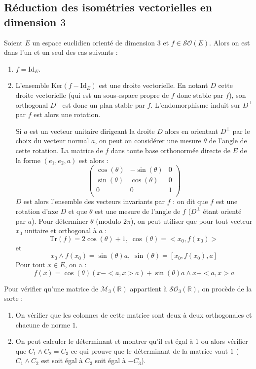 \documentclass[a4paper,10pt]{report}
\begin{document}
\begin{preuve}
\vspace{3cm}
\end{preuve}

\subsection{Réduction des isométries vectorielles en dimension $3$}
\begin{thm}[Admis] Soient $E$ un espace euclidien orienté de dimension $3$ et $f \in \mathcal{SO}(E)$. Alors on est dans l'un et un seul des cas suivants :
\begin{enumerate}
\item $f= \textrm{Id}_E$.
\item L'ensemble $\textrm{Ker}(f - \textrm{Id}_E)$ est une droite vectorielle. En notant $D$ cette droite vectorielle (qui est un sous-espace propre de $f$ donc stable par $f$), son orthogonal $D^{\perp}$ est donc un plan stable par $f$. L'endomorphisme induit sur $D^{\perp}$ par $f$ est alors une rotation.

\medskip

\noindent Si $a$ est un vecteur unitaire dirigeant la droite $D$ alors en orientant $D^{\perp}$ par le choix du vecteur normal $a$, on peut on considérer une mesure $\theta$ de l'angle de cette rotation. La matrice de $f$ dans toute base orthonormée directe de $E$ de la forme $(e_1,e_2,a)$ est alors :
$$ \begin{pmatrix}
\cos(\theta) & -\sin(\theta) & 0 \\
\sin(\theta) & \cos(\theta) & 0 \\
0 & 0 & 1 \\
\end{pmatrix}$$
$D$ est alors l'ensemble des vecteurs invariants par $f$ : on dit que $f$ est une rotation d'axe $D$ et que $\theta$ est une mesure de l'angle de $f$ ($D^{\perp}$ étant orienté par $a$). Pour déterminer $\theta$ (modulo $2 \pi$), on peut utiliser que pour tout vecteur $x_0$ unitaire et orthogonal à $a$ :
$$ \textrm{Tr}(f) = 2 \cos(\theta)+1, \; \cos(\theta) = <x_0, f(x_0)>$$
et 
$$ x_0 \wedge f(x_0) = \sin(\theta) a , \; \sin(\theta) = [x_0, f(x_0),a]$$
Pour tout $x \in E$, on a :
$$ f(x) = \cos(\theta)(x-<a,x>a) + \sin(\theta) a \wedge x + <a,x>a$$
\end{enumerate}
\end{thm}

\begin{rem} Pour vérifier qu'une matrice de $\mathcal{M}_3(\mathbb{R})$ appartient à $\mathcal{SO}_3(\mathbb{R})$, on procède de la sorte :
\begin{enumerate}
\item On vérifier que les colonnes de cette matrice sont deux à deux orthogonales et chacune de norme $1$.
\item On peut calculer le déterminant et montrer qu'il est égal à $1$ ou alors vérifier que $C_1 \wedge C_2 = C_3$ ce qui prouve que le déterminant de la matrice vaut $1$ ($C_1 \wedge C_2$ est soit égal à $C_3$ soit égal à $-C_3$).
\end{enumerate}
\end{rem}
\end{document}
